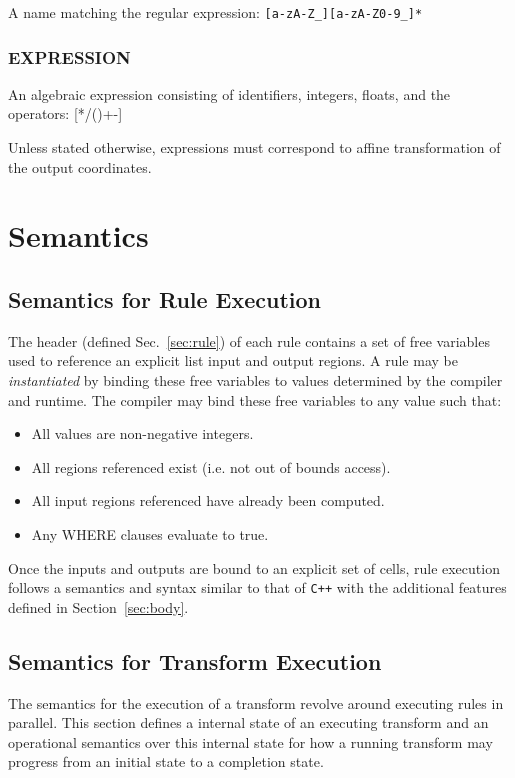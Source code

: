 \documentclass[11pt]{article}
\begin{document}
A name matching the regular expression: {\tt [a-zA-Z\_][a-zA-Z0-9\_]*}

\subsubsection{EXPRESSION}
\label{EXPRESSION}

An algebraic expression consisting of identifiers, integers, floats, and the operators: [*/()+-]

Unless stated otherwise, expressions must correspond to affine transformation
of the output coordinates.

\section{Semantics}

\subsection{Semantics for Rule Execution}

The header (defined Sec.~\ref{sec:rule}) of each rule contains a set of
free variables used to reference an explicit list input and output regions.
A rule may be {\em instantiated} by binding these free variables to values
determined by the compiler and runtime.  The compiler may bind these free
variables to any value such that:
\begin{itemize}
\item All values are non-negative integers.
\item All regions referenced exist (i.e. not out of bounds access).
\item All input regions referenced have already been computed.
\item Any WHERE clauses evaluate to true.
\end{itemize}

Once the inputs and outputs are bound to an explicit set of cells, rule
execution follows a semantics and syntax similar to that of {\tt C++} with
the additional features defined in Section~\ref{sec:body}.


\subsection{Semantics for Transform Execution}

The semantics for the execution of a transform revolve around executing
rules in parallel.  This section defines a internal state of an executing
transform and an operational semantics over this internal state for how a
running transform may progress from an initial state to a completion state.
\end{document}

